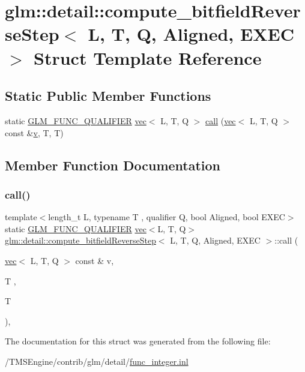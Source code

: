 \hypertarget{structglm_1_1detail_1_1compute__bitfield_reverse_step}{}\section{glm\+:\+:detail\+:\+:compute\+\_\+bitfield\+Reverse\+Step$<$ L, T, Q, Aligned, E\+X\+EC $>$ Struct Template Reference}
\label{structglm_1_1detail_1_1compute__bitfield_reverse_step}
\subsection*{Static Public Member Functions}
\begin{DoxyCompactItemize}
\item 
static \hyperlink{setup_8hpp_a33fdea6f91c5f834105f7415e2a64407}{G\+L\+M\+\_\+\+F\+U\+N\+C\+\_\+\+Q\+U\+A\+L\+I\+F\+I\+ER} \hyperlink{structglm_1_1vec}{vec}$<$ L, T, Q $>$ \hyperlink{structglm_1_1detail_1_1compute__bitfield_reverse_step_aa09f49bf6a1f36a957a628cc01812882}{call} (\hyperlink{structglm_1_1vec}{vec}$<$ L, T, Q $>$ const \&\hyperlink{_s_d_l__opengl_8h_a10a82eabcb59d2fcd74acee063775f90}{v}, T, T)
\end{DoxyCompactItemize}


\subsection{Member Function Documentation}
\mbox{\label{structglm_1_1detail_1_1compute__bitfield_reverse_step_aa09f49bf6a1f36a957a628cc01812882}} 
\subsubsection{\texorpdfstring{call()}{call()}}
{\footnotesize\ttfamily template$<$length\+\_\+t L, typename T , qualifier Q, bool Aligned, bool E\+X\+EC$>$ \\
static \hyperlink{setup_8hpp_a33fdea6f91c5f834105f7415e2a64407}{G\+L\+M\+\_\+\+F\+U\+N\+C\+\_\+\+Q\+U\+A\+L\+I\+F\+I\+ER} \hyperlink{structglm_1_1vec}{vec}$<$L, T, Q$>$ \hyperlink{structglm_1_1detail_1_1compute__bitfield_reverse_step}{glm\+::detail\+::compute\+\_\+bitfield\+Reverse\+Step}$<$ L, T, Q, Aligned, E\+X\+EC $>$\+::call (\begin{DoxyParamCaption}\item[{\hyperlink{structglm_1_1vec}{vec}$<$ L, T, Q $>$ const \&}]{v,  }\item[{T}]{,  }\item[{T}]{ }\end{DoxyParamCaption})\hspace{0.3cm}{\ttfamily [inline]}, {\ttfamily [static]}}



The documentation for this struct was generated from the following file\+:\begin{DoxyCompactItemize}
\item 
/\+T\+M\+S\+Engine/contrib/glm/detail/\hyperlink{func__integer_8inl}{func\+\_\+integer.\+inl}\end{DoxyCompactItemize}
